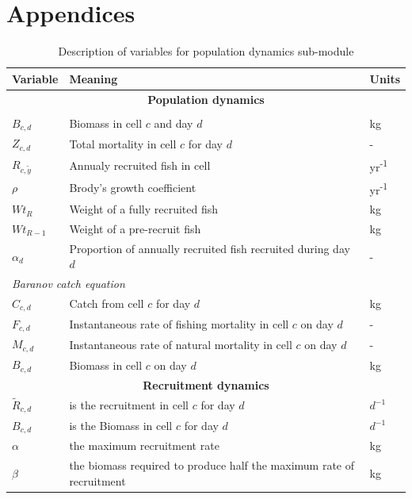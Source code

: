 \documentclass[review]{elsarticle}
\begin{document}
%
\section*{Appendices}

%

\begin{table}[!ht]
	\centering
	\caption{Description of variables for population dynamics sub-module}
	\begin{tabular}{p{1.5cm} p{8cm} p{1.5cm}}
		\toprule
		Variable & Meaning & Units \\
		\hline
		\multicolumn{3}{c}{\textbf{Population dynamics}}  \\
		\hhline{===}
		\multicolumn{3}{l}{\textit{Delay-difference model}} \\
		\hline
		$B_{c,d}$ & Biomass in cell $c$ and day $d$ & kg \\
		$Z_{c,d}$ & Total mortality in cell $c$ for day $d$ & - \\
		$R_{c, \tilde{y}}$  &Annualy recruited fish in cell &  yr\textsuperscript{-1} \\
		$\rho$ & Brody's growth coefficient & yr\textsuperscript{-1} \\
		$Wt_{R}$ & Weight of a fully recruited fish & kg \\
		$Wt_{R-1}$ & Weight of a pre-recruit fish & kg \\
		$\alpha_{d}$ & Proportion of annually recruited fish recruited
		during day $d$ & - \\
		\hline
		\multicolumn{3}{l}{\textit{Baranov catch equation}} \\
		\hline
		$C_{c,d}$ & Catch from cell $c$ for day $d$ & kg \\
		$F_{c,d}$ & Instantaneous rate of fishing mortality in cell $c$
		on day $d$ & - \\
		$M_{c,d}$ & Instantaneous rate of natural mortality in cell $c$
		on day $d$ & - \\
		$B_{c,d}$ & Biomass in cell $c$ on day $d$ & kg \\
		\hline
		\multicolumn{3}{c}{\textbf{Recruitment dynamics}} \\
		\hhline{===}
		$\tilde{R}_{c,d}$ & is the recruitment in cell $c$ for day $d$ & $d^{-1}$ \\
		$B_{c,d}$ & is the Biomass in cell $c$ for day $d$ & $d^{-1}$ \\
		$\alpha$ & the maximum recruitment rate & kg  \\
		$\beta$ & the biomass required to produce half the maximum rate
		of recruitment & kg \\
		\bottomrule
		\end{tabular}
	\end{table}
\end{document}
